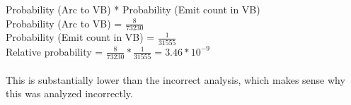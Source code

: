 \documentclass{article}
\begin{document}
\begin{itemize}
\begin{verbatim}
\end{verbatim}
Probability (Arc to VB) * Probability (Emit count in VB)\\
Probability (Arc to VB) = $\frac{8}{73230}$\\
Probability (Emit count in VB) = $\frac{1}{31555}$\\

Relative probability = $\frac{8}{73230} * \frac{1}{31555} = 3.46 * 10^{-9}$\\
\\
This is substantially lower than the incorrect analysis, which makes sense why this was analyzed incorrectly.

 
\end{itemize}
\end{document}
